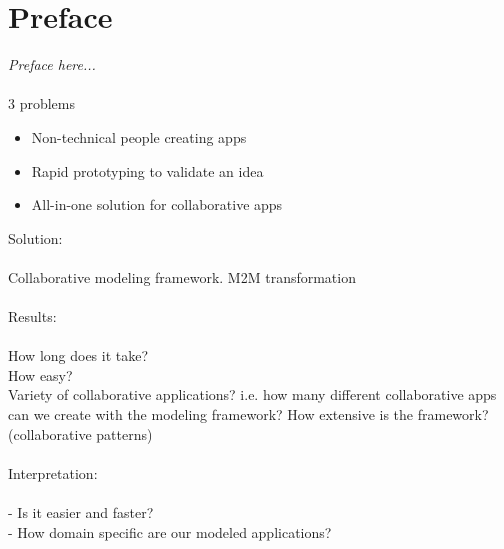 \chapter*{Preface}

\textit{Preface here...}
\\ \\
3 problems
\begin{itemize}
\item{Non-technical people creating apps}
\item{Rapid prototyping to validate an idea}
\item{All-in-one solution for collaborative apps}
\end{itemize}
Solution: \\ \\
Collaborative modeling framework.
M2M transformation
\\ \\
Results: \\ \\
How long does it take? \\
How easy? \\
Variety of collaborative applications? i.e. how many different collaborative apps can we create with the modeling framework? How extensive is the framework? (collaborative patterns)
\\ \\
Interpretation: \\ \\
- Is it easier and faster? \\
- How domain specific are our modeled applications?
